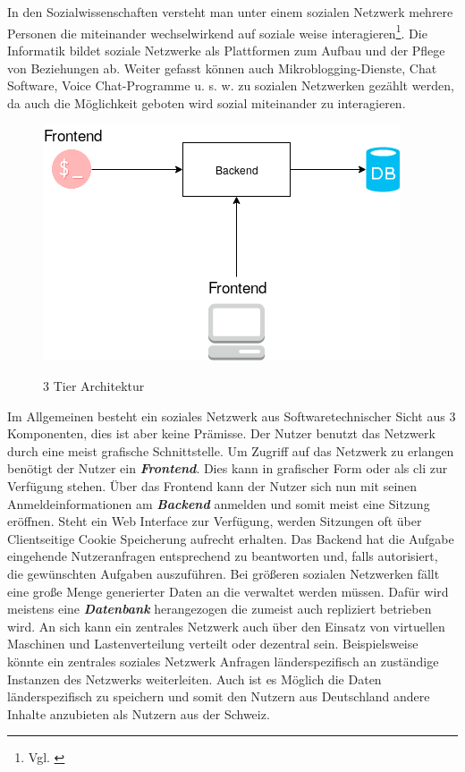 \section{
}
	In den Sozialwissenschaften versteht man unter einem sozialen Netzwerk mehrere Personen die miteinander wechselwirkend auf soziale weise interagieren\footnote{Vgl. \cite{wikipedia-social-network-sociology}}. Die Informatik bildet soziale Netzwerke als Plattformen zum Aufbau und der Pflege von Beziehungen ab. Weiter gefasst können auch Mikroblogging-Dienste, Chat Software, Voice Chat-Programme u. s. w. zu sozialen Netzwerken gezählt werden, da auch die Möglichkeit geboten wird sozial miteinander zu interagieren.
	\begin{figure}[H]
		\begin{minipage}{\textwidth}
			\centering
			\includegraphics[scale=0.55]{figures/central-social-network.png}
			\label{fig:central-social-network}
			\caption{3 Tier Architektur}
		\end{minipage}
	\end{figure}
	Im Allgemeinen besteht ein soziales Netzwerk aus Softwaretechnischer Sicht aus 3 Komponenten, dies ist aber keine Prämisse. Der Nutzer benutzt das Netzwerk durch eine meist grafische Schnittstelle. Um Zugriff auf das Netzwerk zu erlangen benötigt der Nutzer ein \textit{\textbf{Frontend}}. Dies kann in grafischer Form oder als \gls{cli} zur Verfügung stehen. Über das Frontend kann der Nutzer sich nun mit seinen Anmeldeinformationen am \textit{\textbf{Backend}} anmelden und somit meist eine Sitzung eröffnen. Steht ein Web Interface zur Verfügung, werden Sitzungen oft über Clientseitige Cookie Speicherung aufrecht erhalten. Das Backend hat die Aufgabe eingehende Nutzeranfragen entsprechend zu beantworten und, falls autorisiert, die gewünschten Aufgaben auszuführen. Bei größeren sozialen Netzwerken fällt eine große Menge generierter Daten an die verwaltet werden müssen. Dafür wird meistens eine \textit{\textbf{Datenbank}} herangezogen die zumeist auch repliziert betrieben wird. An sich kann ein zentrales Netzwerk auch über den Einsatz von virtuellen Maschinen und Lastenverteilung verteilt oder dezentral sein. Beispielsweise könnte ein zentrales soziales Netzwerk Anfragen länderspezifisch an zuständige Instanzen des Netzwerks weiterleiten. Auch ist es Möglich die Daten länderspezifisch zu speichern und somit den Nutzern aus Deutschland andere Inhalte anzubieten als Nutzern aus der Schweiz.
